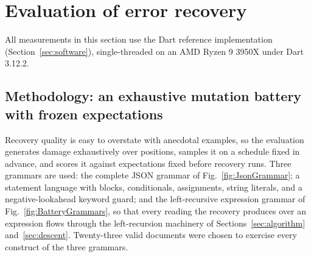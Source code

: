 \documentclass[manuscript]{acmart}
\begin{document}
\section{Evaluation of error recovery}
\label{sec:evaluation}

All measurements in this section use the Dart reference implementation (Section~\ref{sec:software}), single-threaded on an AMD Ryzen 9 3950X under Dart 3.12.2.

\subsection{Methodology: an exhaustive mutation battery with frozen expectations}
\label{sec:methodology}

Recovery quality is easy to overstate with anecdotal examples, so the evaluation generates damage exhaustively over positions, samples it on a schedule fixed in advance, and scores it against expectations fixed before recovery runs. Three grammars are used: the complete JSON grammar of Fig.~\ref{fig:JsonGrammar}; a statement language with blocks, conditionals, assignments, string literals, and a negative-lookahead keyword guard; and the left-recursive expression grammar of Fig.~\ref{fig:BatteryGrammars}, so that every reading the recovery produces over an expression flows through the left-recursion machinery of Sections~\ref{sec:algorithm} and~\ref{sec:descent}. Twenty-three valid documents were chosen to exercise every construct of the three grammars.
\end{document}

